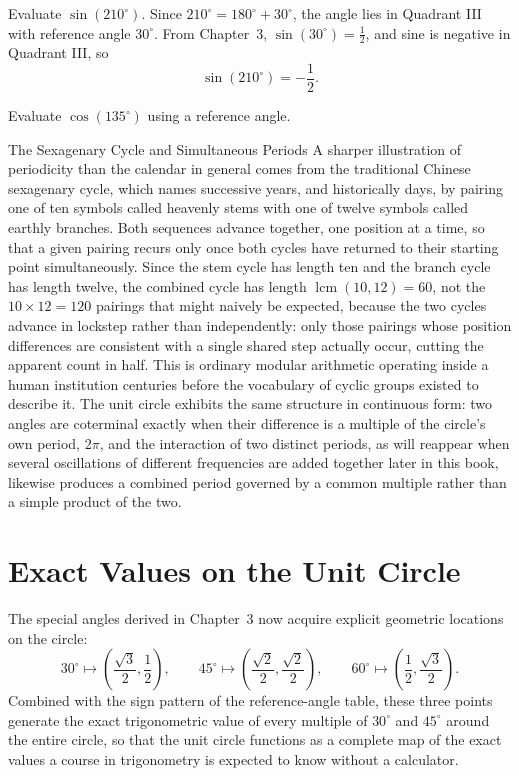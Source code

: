 \begin{example}
Evaluate $\sin(210^\circ)$. Since $210^\circ = 180^\circ + 30^\circ$, the
angle lies in Quadrant III with reference angle $30^\circ$. From
Chapter~3, $\sin(30^\circ) = \tfrac12$, and sine is negative in Quadrant
III, so
\[
\sin(210^\circ) = -\frac12.
\]
\end{example}

\begin{practicenow}
Evaluate $\cos(135^\circ)$ using a reference angle.
\end{practicenow}

\begin{sidebar}{The Sexagenary Cycle and Simultaneous Periods}
A sharper illustration of periodicity than the calendar in general comes
from the traditional Chinese sexagenary cycle, which names successive
years, and historically days, by pairing one of ten symbols called
heavenly stems with one of twelve symbols called earthly branches. Both
sequences advance together, one position at a time, so that a given
pairing recurs only once both cycles have returned to their starting
point simultaneously. Since the stem cycle has length ten and the branch
cycle has length twelve, the combined cycle has length
$\operatorname{lcm}(10,12) = 60$, not the $10\times12 = 120$ pairings that
might naively be expected, because the two cycles advance in lockstep
rather than independently: only those pairings whose position differences
are consistent with a single shared step actually occur, cutting the
apparent count in half. This is ordinary modular arithmetic operating
inside a human institution centuries before the vocabulary of cyclic
groups existed to describe it. The unit circle exhibits the same
structure in continuous form: two angles are coterminal exactly when
their difference is a multiple of the circle's own period, $2\pi$, and
the interaction of two distinct periods, as will reappear when several
oscillations of different frequencies are added together later in this
book, likewise produces a combined period governed by a common multiple
rather than a simple product of the two.
\end{sidebar}

\section{Exact Values on the Unit Circle}

The special angles derived in Chapter~3 now acquire explicit geometric
locations on the circle:
\[
30^\circ \mapsto \left(\frac{\sqrt3}{2}, \frac12\right), \qquad
45^\circ \mapsto \left(\frac{\sqrt2}{2}, \frac{\sqrt2}{2}\right), \qquad
60^\circ \mapsto \left(\frac12, \frac{\sqrt3}{2}\right).
\]
Combined with the sign pattern of the reference-angle table, these three
points generate the exact trigonometric value of every multiple of
$30^\circ$ and $45^\circ$ around the entire circle, so that the unit circle
functions as a complete map of the exact values a course in trigonometry is
expected to know without a calculator.

